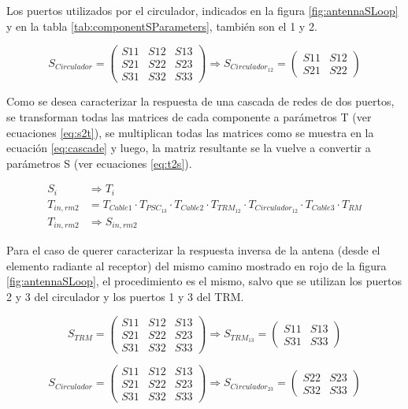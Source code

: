 Los puertos utilizados por el circulador, indicados en la figura \ref{fig:antennaSLoop} y en la tabla \ref{tab:componentSParameters},
también son el 1 y 2. 

$$
	S_{Circulador} = \begin{pmatrix} S11&S12&S13 \\ S21&S22&S23 \\ S31&S32&S33\end{pmatrix} \Rightarrow
	S_{Circulador_{12}} = \begin{pmatrix} S11&S12 \\ S21&S22 \end{pmatrix}
$$

Como se desea caracterizar la respuesta de una cascada de redes de dos puertos, se transforman todas las matrices de cada
componente a parámetros T (ver ecuaciones \ref{eq:s2t}), se multiplican todas las matrices como se muestra en la ecuación
\ref{eq:cascade} y luego, la matriz resultante se la vuelve a convertir a parámetros S (ver ecuaciones \ref{eq:t2s}).

$$
\begin{aligned}
	S_i &\Rightarrow T_i \\
	T_{in,rm2} &= T_{Cable1}\cdot T_{PSC_{13}}\cdot T_{Cable2}\cdot T_{TRM_{12}}\cdot T_{Circulador_{12}}\cdot T_{Cable3}\cdot T_{RM}\\
	T_{in,rm2} &\Rightarrow S_{in,rm2}
\end{aligned}
$$

Para el caso de querer caracterizar la respuesta inversa de la antena (desde el elemento radiante al receptor) del mismo camino
mostrado en rojo de la figura \ref{fig:antennaSLoop}, el procedimiento es el mismo, salvo que se utilizan los puertos 2 y 3 del
circulador y los puertos 1 y 3 del TRM.

$$
	S_{TRM} = \begin{pmatrix} S11&S12&S13 \\ S21&S22&S23 \\ S31&S32&S33\end{pmatrix} \Rightarrow
	S_{TRM_{13}} = \begin{pmatrix} S11&S13 \\ S31&S33 \end{pmatrix}
$$

$$
	S_{Circulador} = \begin{pmatrix} S11&S12&S13 \\ S21&S22&S23 \\ S31&S32&S33\end{pmatrix} \Rightarrow
	S_{Circulador_{23}} = \begin{pmatrix} S22&S23 \\ S32&S33 \end{pmatrix}
$$

